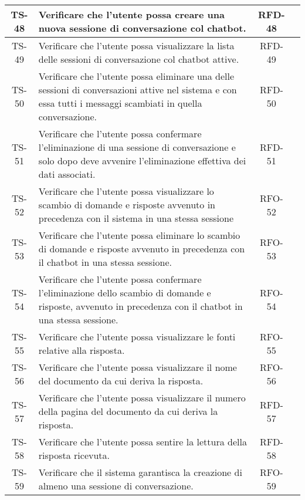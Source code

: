 \begin{xltabular}{\textwidth}{| c | X | c | c |}
    \hline
    TS-48 & Verificare che l'utente possa creare una nuova sessione di conversazione col chatbot. & RFD-48 & \textcolor{xmarkcolor}{} \\
    \hline
    TS-49 & Verificare che l'utente possa visualizzare la lista delle sessioni di conversazione col chatbot attive. & RFD-49 & \textcolor{xmarkcolor}{} \\
    \hline
    TS-50 & Verificare che l'utente possa eliminare una delle sessioni di conversazioni attive nel sistema e con essa tutti i messaggi scambiati in quella conversazione. & RFD-50 & \textcolor{xmarkcolor}{} \\
    \hline
    TS-51 & Verificare che l'utente possa confermare l’eliminazione di una sessione di conversazione e solo dopo deve avvenire l'eliminazione effettiva dei dati associati. & RFD-51 & \textcolor{xmarkcolor}{} \\
    \hline
    TS-52 & Verificare che l'utente possa visualizzare lo scambio di domande e risposte avvenuto in precedenza con il sistema in una stessa sessione & RFO-52 & \textcolor{xmarkcolor}{} \\
    \hline
    TS-53 & Verificare che l'utente possa eliminare lo scambio di domande e risposte avvenuto in precedenza con il chatbot in una stessa sessione. & RFO-53 & \textcolor{xmarkcolor}{} \\
    \hline
    TS-54 & Verificare che l'utente possa confermare l'eliminazione dello scambio di domande e risposte, avvenuto in precedenza con il chatbot in una stessa sessione. & RFO-54 & \textcolor{xmarkcolor}{} \\
    \hline
    TS-55 & Verificare che l'utente possa visualizzare le fonti relative alla risposta. & RFO-55 & \textcolor{xmarkcolor}{} \\
    \hline
    TS-56 & Verificare che l'utente possa visualizzare il nome del documento da cui deriva la risposta. & RFO-56 & \textcolor{xmarkcolor}{} \\
    \hline
    TS-57 & Verificare che l'utente possa visualizzare il numero della pagina del documento da cui deriva la risposta. & RFD-57 & \textcolor{xmarkcolor}{} \\
    \hline
    TS-58 & Verificare che l'utente possa sentire la lettura della risposta ricevuta. & RFD-58 & \textcolor{xmarkcolor}{} \\
    \hline
    TS-59 & Verificare che il sistema garantisca la creazione di almeno una sessione di conversazione. & RFO-59 & \textcolor{xmarkcolor}{} \\

\end{xltabular}
